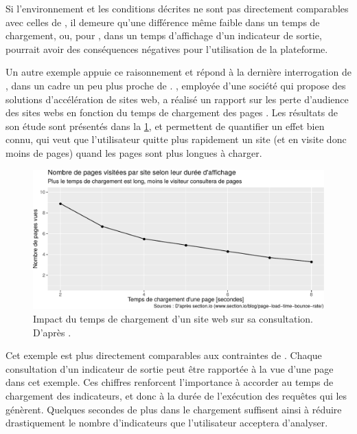 Si l'environnement et les conditions décrites ne sont pas directement comparables avec celles de \simedb{}, il demeure qu'une différence même faible dans un temps de chargement, ou, pour \simedb{}, dans un temps d'affichage d'un indicateur de sortie, pourrait avoir des conséquences négatives pour l'utilisation de la plateforme.

Un autre exemple appuie ce raisonnement et répond à la dernière interrogation de \citeauthor{patel_speed_2011}, dans un cadre un peu plus proche de \simedb{}.
, employée d'une société qui propose des solutions d'accélération de sites web, a réalisé un rapport sur les perte d'audience des sites webs en fonction du temps de chargement des pages \autocite{elliott_how_2017}.
Les résultats de son étude sont présentés dans la \cref{fig:page-abandon}, et permettent de quantifier un effet bien connu, qui veut que l'utilisateur quitte plus rapidement un site (et en visite donc moins de pages) quand les pages sont plus longues à charger.
\clearpage

\begin{figure}[H]
	\centering
	\includegraphics[width=.9\linewidth]{img/abandon_pages.pdf}
	\caption[Impact du temps de chargement d'un site web sur sa consultation.]{Impact du temps de chargement d'un site web sur sa consultation. D'après \textcite{elliott_how_2017}.}
	\label{fig:page-abandon}
\end{figure}

Cet exemple est plus directement comparables aux contraintes de \simedb{}.
Chaque consultation d'un indicateur de sortie peut être rapportée à la vue d'une page dans cet exemple.
Ces chiffres renforcent l'importance à accorder au temps de chargement des indicateurs, et donc à la durée de l'exécution des requêtes qui les génèrent.
Quelques secondes de plus dans le chargement suffisent ainsi à réduire drastiquement le nombre d'indicateurs que l'utilisateur acceptera d'analyser.

